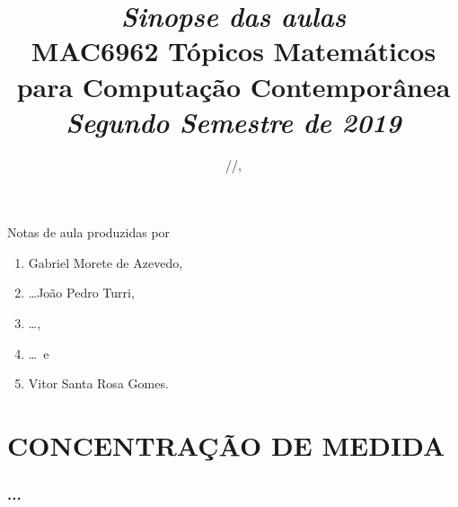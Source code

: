


\linenumbers

\title[MAC6962 Tópicos Matemáticos para Computação Contemporânea]{%
{\small\sl Sinopse das aulas}\\\bigskip
MAC6962 Tópicos Matemáticos para Computação Contemporânea\\\bigskip
{\it Segundo Semestre de 2019}
}

\address{Instituto de Matemática e Estatística, Universidade de São
  Paulo, Rua do Matão 1010, 05508--090~São Paulo, SP}


\yyyymmdddate
\shortdate
\def\today{\number\year/\number\month/\number\day}
\date{\today, \currenttime}
\footskip=28pt


\maketitle

\section*{}
\label{sec:prefacio}
\doublespace
Notas de aula produzidas por
\begin{enumerate}[label=\nplain]
  \item Gabriel Morete de Azevedo,
  \item \dots João Pedro Turri,
  \item \dots,
  \item \dots\ e
  \item Vitor Santa Rosa Gomes.
\end{enumerate}

\endgroup
\newpage\onehalfspace
\tableofcontents
\pagestyle{fancy}

\endgroup
\doublespace

\newpage
\part{CONCENTRAÇÃO DE MEDIDA}

\section{...}
\label{...}

